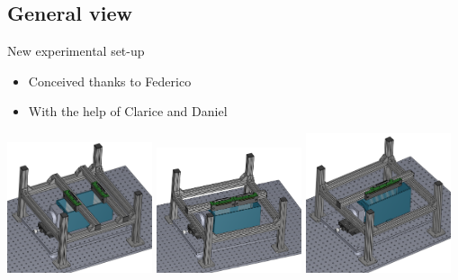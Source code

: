 \documentclass[utf8]{beamer} \usetheme{lfcr} %
\begin{document}
\subsection{General view}
\begin{frame}{New experimental set-up}

  \begin{itemize}
    \item Conceived thanks to Federico
    \item With the help of Clarice and Daniel
  \end{itemize}

  \begin{center}
    \includegraphics[width=0.32\textwidth]{Smallcombs_2.PNG}
    \includegraphics[width=0.32\textwidth]{Smallcombs_1.PNG}
    \includegraphics[width=0.32\textwidth]{Bigcomb.PNG}
  \end{center}
 
\end{frame}
%
\end{document}
